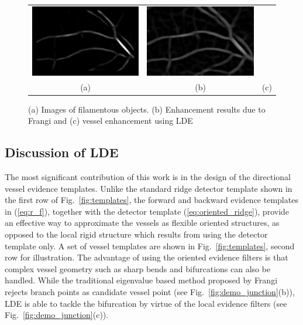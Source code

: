 \begin{figure}[t]
\begin{tabular}{@{}ccc @{}}
		\includegraphics[width=0.28\linewidth]{./images/LDE/Enhancements/vessel_crop_1_enh_frangi} & 		
		\includegraphics[width=0.28\linewidth]{./images/LDE/Enhancements/vessel_crop_1_enh_ours} 	\\
		\scriptsize (a) & 		\scriptsize (b) & 		\scriptsize (c) 
	\end{tabular}
\caption{(a) Images of filamentous objects. (b) Enhancement results due to Frangi and (c) vessel enhancement using LDE}
\label{fig:enhanced}
\end{figure}

\subsection{Discussion of LDE}
The most significant contribution of this work is in the design of the directional vessel evidence templates. Unlike the standard ridge detector template shown in the first row of Fig.~\ref{fig:templates}, the forward and backward evidence templates in (\ref{eq:r_f}), together with the detector template (\ref{eq:oriented_ridge}), provide an effective way to approximate the vessels as flexible oriented structures, as opposed to the local rigid structure which results from using the detector template only. A set of vessel templates are shown in Fig.~\ref{fig:templates}, second row for illustration. The advantage of using the oriented evidence filters is that complex vessel geometry such as sharp bends and bifurcations can also be handled. While the traditional eigenvalue based method proposed by Frangi\cite{frangi_vesselness} rejects branch points as candidate vessel point (see Fig.~\ref{fig:demo_junction}(b)), LDE is able to tackle the bifurcation by virtue of the local evidence filters (see Fig.~\ref{fig:demo_junction}(c)). 

